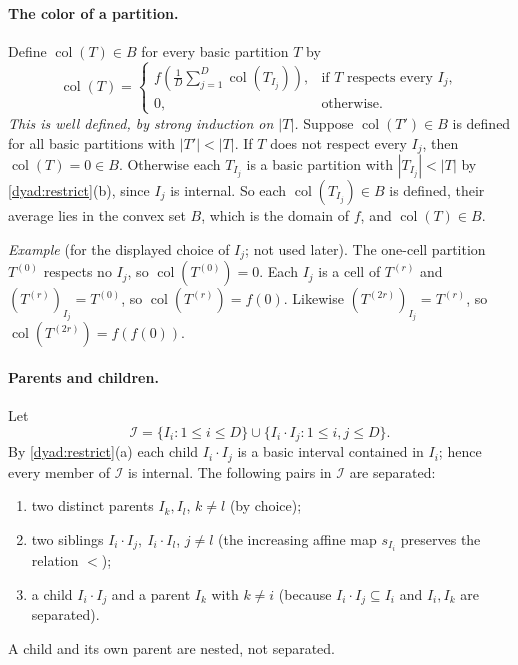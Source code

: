 \documentclass[11pt]{article}
\DeclareMathOperator{\colr}{col}
\theoremstyle{definition}
\numberwithin{equation}{section}
\begin{document}
\paragraph{The color of a partition.}
Define \(\colr(T)\in B\) for every basic partition \(T\) by
\begin{equation}\label{color:recursion}
  \colr(T)=
  \begin{cases}
  \displaystyle f\left(\frac1D\sum_{j=1}^D \colr(T_{I_j})\right),
       &\text{if $T$ respects every $I_j$},\\[6pt]
  0,   &\text{otherwise}.
  \end{cases}
\end{equation}
\emph{This is well defined, by strong induction on \(|T|\).} Suppose
\(\colr(T')\in B\) is defined for all basic partitions with \(|T'|<|T|\). If
\(T\) does not respect every \(I_j\), then \(\colr(T)=0\in B\). Otherwise each
\(T_{I_j}\) is a basic partition with \(|T_{I_j}|<|T|\) by
\cref{dyad:restrict}(b), since \(I_j\) is internal. So each
\(\colr(T_{I_j})\in B\) is defined, their average lies in the convex set
\(B\), which is the domain of \(f\), and \(\colr(T)\in B\).

\emph{Example} (for the displayed choice of \(I_j\); not used later). The
one-cell partition \(T^{(0)}\) respects no \(I_j\), so \(\colr(T^{(0)})=0\).
Each \(I_j\) is a cell of \(T^{(r)}\) and \((T^{(r)})_{I_j}=T^{(0)}\), so
\(\colr(T^{(r)})=f(0)\). Likewise \((T^{(2r)})_{I_j}=T^{(r)}\), so
\(\colr(T^{(2r)})=f(f(0))\).

\paragraph{Parents and children.}
Let
\[
  \mathcal I=\{I_i:1\leq i\leq D\}
       \cup\{I_i\cdot I_j:1\leq i,j\leq D\}.
\]
By \cref{dyad:restrict}(a) each child \(I_i\cdot I_j\) is a basic interval
contained in \(I_i\); hence every member of \(\mathcal I\) is internal. The
following pairs in \(\mathcal I\) are separated:
\begin{enumerate}[label=(\Alph*)]
\item[(P)] two distinct parents \(I_k,I_l\), \(k\ne l\) (by choice);
\item[(S)] two siblings \(I_i\cdot I_j,\ I_i\cdot I_l\), \(j\ne l\) (the
increasing affine map \(s_{I_i}\) preserves the relation \(<\));
\item[(M)] a child \(I_i\cdot I_j\) and a parent \(I_k\) with \(k\ne i\)
(because \(I_i\cdot I_j\subseteq I_i\) and \(I_i,I_k\) are separated).
\end{enumerate}
A child and its own parent are nested, not separated.
\end{document}

